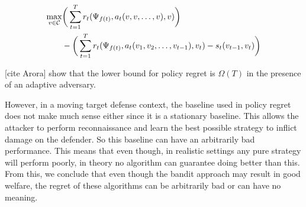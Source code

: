 \begin{align*}
    \max_{v \in \cal C} & \bigg (\sum_{t=1}^T r_t(\Psi_{f(t)}, a_t(v, v, \dots, v), v) \bigg ) \\
    & - \bigg ( \sum_{t=1}^T r_t(\Psi_{f(t)}, a_t(v_1, v_2, \dots, v_{t-1}), v_t) - s_t(v_{t-1}, v_t) \bigg ) 
\end{align*}

[cite Arora] show that the lower bound for policy regret is $\Omega (T)$ in the presence of an adaptive adversary. 

However, in a moving target defense context, the baseline used in policy regret does not make much sense either since it is a stationary baseline. This allows the attacker to perform reconnaissance and learn the best possible strategy to inflict damage on the defender. So this baseline can have an arbitrarily bad performance. This means that even though, in realistic settings any pure strategy will perform poorly, in theory no algorithm can guarantee doing better than this. From this, we conclude that even though the bandit approach may result in good welfare, the regret of these algorithms can be arbitrarily bad or can have no meaning.




